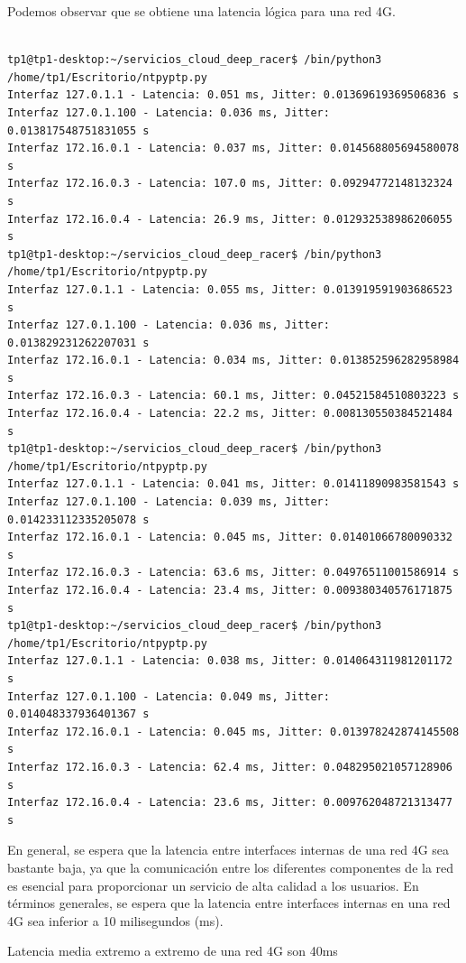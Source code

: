 Podemos observar que se obtiene una latencia lógica para una red 4G.

\begin{lstlisting}[caption={Salida del fichero python que calcula retardos entre interfaces.}]

tp1@tp1-desktop:~/servicios_cloud_deep_racer$ /bin/python3 /home/tp1/Escritorio/ntpyptp.py
Interfaz 127.0.1.1 - Latencia: 0.051 ms, Jitter: 0.01369619369506836 s
Interfaz 127.0.1.100 - Latencia: 0.036 ms, Jitter: 0.013817548751831055 s
Interfaz 172.16.0.1 - Latencia: 0.037 ms, Jitter: 0.014568805694580078 s
Interfaz 172.16.0.3 - Latencia: 107.0 ms, Jitter: 0.09294772148132324 s
Interfaz 172.16.0.4 - Latencia: 26.9 ms, Jitter: 0.012932538986206055 s
tp1@tp1-desktop:~/servicios_cloud_deep_racer$ /bin/python3 /home/tp1/Escritorio/ntpyptp.py
Interfaz 127.0.1.1 - Latencia: 0.055 ms, Jitter: 0.013919591903686523 s
Interfaz 127.0.1.100 - Latencia: 0.036 ms, Jitter: 0.013829231262207031 s
Interfaz 172.16.0.1 - Latencia: 0.034 ms, Jitter: 0.013852596282958984 s
Interfaz 172.16.0.3 - Latencia: 60.1 ms, Jitter: 0.04521584510803223 s
Interfaz 172.16.0.4 - Latencia: 22.2 ms, Jitter: 0.008130550384521484 s
tp1@tp1-desktop:~/servicios_cloud_deep_racer$ /bin/python3 /home/tp1/Escritorio/ntpyptp.py
Interfaz 127.0.1.1 - Latencia: 0.041 ms, Jitter: 0.01411890983581543 s
Interfaz 127.0.1.100 - Latencia: 0.039 ms, Jitter: 0.014233112335205078 s
Interfaz 172.16.0.1 - Latencia: 0.045 ms, Jitter: 0.01401066780090332 s
Interfaz 172.16.0.3 - Latencia: 63.6 ms, Jitter: 0.04976511001586914 s
Interfaz 172.16.0.4 - Latencia: 23.4 ms, Jitter: 0.009380340576171875 s
tp1@tp1-desktop:~/servicios_cloud_deep_racer$ /bin/python3 /home/tp1/Escritorio/ntpyptp.py
Interfaz 127.0.1.1 - Latencia: 0.038 ms, Jitter: 0.014064311981201172 s
Interfaz 127.0.1.100 - Latencia: 0.049 ms, Jitter: 0.014048337936401367 s
Interfaz 172.16.0.1 - Latencia: 0.045 ms, Jitter: 0.013978242874145508 s
Interfaz 172.16.0.3 - Latencia: 62.4 ms, Jitter: 0.048295021057128906 s
Interfaz 172.16.0.4 - Latencia: 23.6 ms, Jitter: 0.009762048721313477 s
\end{lstlisting}

En general, se espera que la latencia entre interfaces internas de una red 4G sea bastante baja, ya que la comunicación entre los diferentes componentes de la red es esencial para proporcionar un servicio de alta calidad a los usuarios. En términos generales, se espera que la latencia entre interfaces internas en una red 4G sea inferior a 10 milisegundos (ms).

Latencia media extremo a extremo de una red 4G son 40ms


